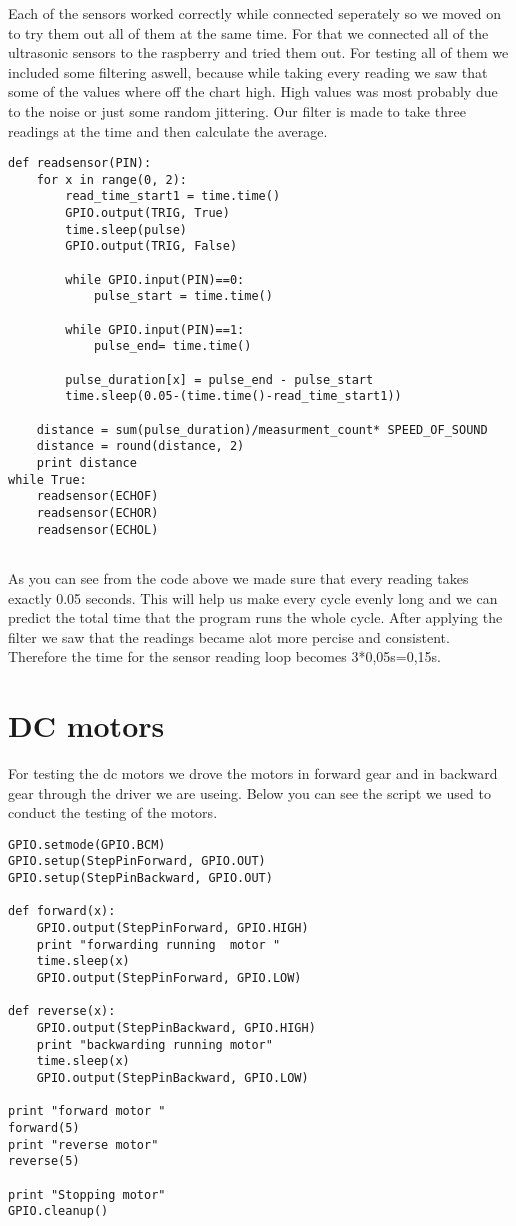 Each of the sensors worked correctly while connected seperately so we moved on to try them out all of them at the same time.
For that we connected all of the ultrasonic sensors to the raspberry and tried them out.
For testing all of them we included some filtering aswell, because while taking every reading we saw that some of the values where off the chart high.
High values was most probably due to the noise or just some random jittering.
Our filter is made to take three readings at the time and then calculate the average.

\begin{lstlisting}
def readsensor(PIN):
	for x in range(0, 2):
		read_time_start1 = time.time()
		GPIO.output(TRIG, True)
		time.sleep(pulse)
		GPIO.output(TRIG, False)

		while GPIO.input(PIN)==0:
			pulse_start = time.time()

		while GPIO.input(PIN)==1:
			pulse_end= time.time()

		pulse_duration[x] = pulse_end - pulse_start
		time.sleep(0.05-(time.time()-read_time_start1))

	distance = sum(pulse_duration)/measurment_count* SPEED_OF_SOUND
	distance = round(distance, 2)
	print distance
while True:
	readsensor(ECHOF)
	readsensor(ECHOR)
	readsensor(ECHOL)
	
\end{lstlisting}

As you can see from the code above we made sure that every reading takes exactly 0.05 seconds.
This will help us make every cycle evenly long and we can predict the total time that the program runs the whole cycle.
After applying the filter we saw that the readings became alot more percise and consistent.
Therefore the time for the sensor reading loop becomes 3*0,05s=0,15s.

\section{DC motors}

For testing the dc motors we drove the motors in forward gear and in backward gear through the driver we are useing.
Below you can see the script we used to conduct the testing of the motors.

\begin{lstlisting}
GPIO.setmode(GPIO.BCM)
GPIO.setup(StepPinForward, GPIO.OUT)
GPIO.setup(StepPinBackward, GPIO.OUT)

def forward(x):
    GPIO.output(StepPinForward, GPIO.HIGH)
    print "forwarding running  motor "
    time.sleep(x)
    GPIO.output(StepPinForward, GPIO.LOW)

def reverse(x):
    GPIO.output(StepPinBackward, GPIO.HIGH)
    print "backwarding running motor"
    time.sleep(x)
    GPIO.output(StepPinBackward, GPIO.LOW)

print "forward motor "
forward(5)
print "reverse motor"
reverse(5)

print "Stopping motor"
GPIO.cleanup()

\end{lstlisting}

